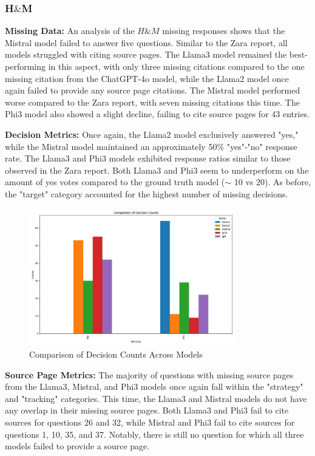 \documentclass[]{article}
\begin{document}
\subsubsection{H$\&$M}
\textbf{Missing Data:} An analysis of the $H\&M$ missing responses shows that the Mistral model failed to answer 
five questions. Similar to the Zara report, 
all models struggled with citing source pages. 
The Llama3 model remained the best-performing in this aspect, with only three missing citations compared to the one missing citation from the ChatGPT-4o model,
while the Llama2 model once again failed to provide any source page citations. 
The Mistral model performed worse compared to the Zara report, 
with seven missing citations this time. 
The Phi3 model also showed a slight decline, failing to cite source pages for 43 entries.
\newline\newline

\textbf{Decision Metrics:}
Once again, the Llama2 model exclusively answered "yes," 
while the Mistral model maintained an approximately 50\% "yes"-"no" response rate. 
The Llama3 and Phi3 models exhibited response ratios similar to those observed in the Zara report.
Both Llama3 and Phi3 seem to underperform on the amount of yes votes compared to the ground truth model ($\sim$ 10 vs 20).
As before, the "target" category accounted for the highest number of missing decisions.

\begin{figure}[H]
    \centering
    \includegraphics[width=0.8\textwidth]{./images/hm_comparison_decision.jpg}
    \caption{Comparison of Decision Counts Across Models}
    \label{fig:image_label}
\end{figure}

\textbf{Source Page Metrics:} The majority of questions with missing source pages from the Llama3, Mistral, 
and Phi3 models once again fall within the "strategy" and 
"tracking" categories. This time, the Llama3 and Mistral models do not have any overlap in their 
missing source pages. Both Llama3 and Phi3 fail to cite sources for questions 26 and 32, 
while Mistral and Phi3 fail to cite sources for questions 1, 10, 35, and 37. 
Notably, there is still no question for which all three models failed to provide a source page.
\newline\newline
\end{document}
